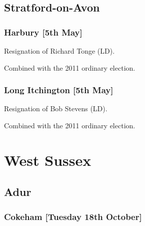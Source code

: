 \begin{resultsiii}
\subsection*{Stratford-on-Avon}

\subsubsection*{Harbury \hspace*{\fill}\nolinebreak[1]%
\enspace\hspace*{\fill}
[5th May]}


Resignation of Richard Tonge (LD).

Combined with the 2011 ordinary election.

\subsubsection*{Long Itchington \hspace*{\fill}\nolinebreak[1]%
\enspace\hspace*{\fill}
[5th May]}


Resignation of Bob Stevens (LD).

Combined with the 2011 ordinary election.

\section{West Sussex}

\subsection*{Adur}

\subsubsection*{Cokeham \hspace*{\fill}\nolinebreak[1]%
\enspace\hspace*{\fill}
[Tuesday 18th October]}



\end{resultsiii}
